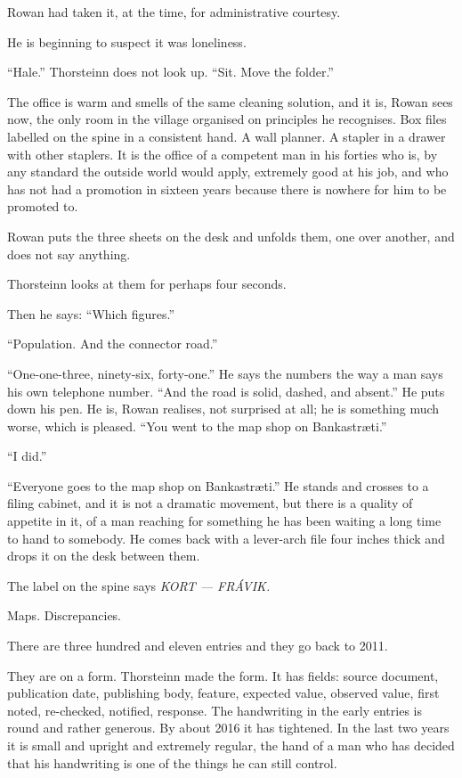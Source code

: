 \documentclass[11pt,oneside]{book}
\newcommand{\sceneline}{%
  \par\vspace{1.2em}
  \begin{center}
    \fontsize{11}{11}\selectfont \textbullet\quad\textbullet\quad\textbullet
  \end{center}
  \vspace{0.6em}\noindent\ignorespaces
}
\begin{document}
Rowan had taken it, at the time, for administrative courtesy.

He is beginning to suspect it was loneliness.

\sceneline

``Hale.'' Thorsteinn does not look up. ``Sit. Move the folder.''

The office is warm and smells of the same cleaning solution, and it is,
Rowan sees now, the only room in the village organised on principles he
recognises. Box files labelled on the spine in a consistent hand. A wall
planner. A stapler in a drawer with other staplers. It is the office of
a competent man in his forties who is, by any standard the outside world
would apply, extremely good at his job, and who has not had a promotion
in sixteen years because there is nowhere for him to be promoted to.

Rowan puts the three sheets on the desk and unfolds them, one over
another, and does not say anything.

Thorsteinn looks at them for perhaps four seconds.

Then he says: ``Which figures.''

``Population. And the connector road.''

``One-one-three, ninety-six, forty-one.'' He says the numbers the way a
man says his own telephone number. ``And the road is solid, dashed, and
absent.'' He puts down his pen. He is, Rowan realises, not surprised at
all; he is something much worse, which is pleased. ``You went to the map
shop on Bankastræti.''

``I did.''

``Everyone goes to the map shop on Bankastræti.'' He stands and crosses
to a filing cabinet, and it is not a dramatic movement, but there is a
quality of appetite in it, of a man reaching for something he has been
waiting a long time to hand to somebody. He comes back with a lever-arch
file four inches thick and drops it on the desk between them.

The label on the spine says \emph{KORT --- FRÁVIK.}

Maps. Discrepancies.

\sceneline

There are three hundred and eleven entries and they go back to 2011.

They are on a form. Thorsteinn made the form. It has fields: source
document, publication date, publishing body, feature, expected value,
observed value, first noted, re-checked, notified, response. The
handwriting in the early entries is round and rather generous. By about
2016 it has tightened. In the last two years it is small and upright and
extremely regular, the hand of a man who has decided that his
handwriting is one of the things he can still control.
\end{document}
